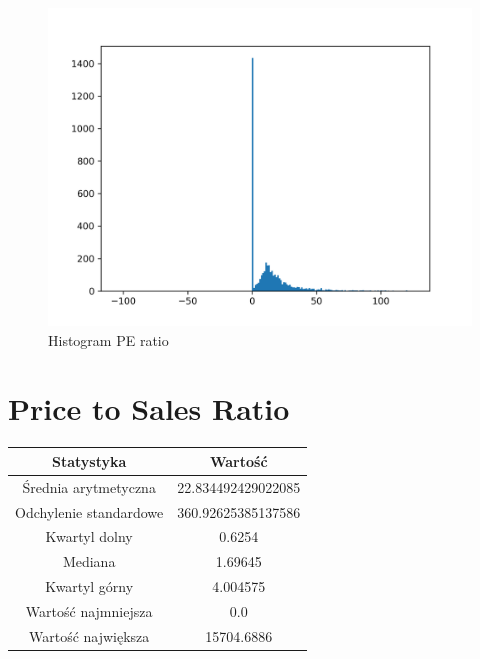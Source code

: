 \documentclass{article}
\begin{document}
\begin{figure}[h!]
    \includegraphics[width=\linewidth]{variables/PE ratio.png}
    \caption{Histogram PE ratio }
\end{figure}\section{ Price to Sales Ratio }

\begin{center}
    \begin{tabular}{|c | c|} 
    \hline
    Statystyka & Wartość \\
    \hline\hline
    Średnia arytmetyczna & 22.834492429022085 \\ 
    \hline
    Odchylenie standardowe & 360.92625385137586 \\
    \hline
    Kwartyl dolny & 0.6254 \\
    \hline
    Mediana & 1.69645 \\
    \hline
    Kwartyl górny & 4.004575 \\
    \hline
    Wartość najmniejsza & 0.0 \\
    \hline
    Wartość największa & 15704.6886 \\
    \hline
   \end{tabular}
\end{center}
\end{document}
